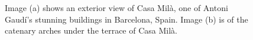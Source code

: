 \documentclass{thesis}
\begin{document}
\begin{figure}
\centering
{}
\caption[Casa Mil\`{a}, Barcelona, Spain]{Image (a) shows an exterior view of Casa Mil\`{a}, one of Antoni Gaud\'{i}'s stunning buildings in
Barcelona, Spain. \cite{img:casa_mila}  Image (b) is of the catenary arches under the terrace of Casa Mil\`{a}. \cite{img:casa_mila_arch}}
\label{fig:casa_mila}
\end{figure}
\end{document}
